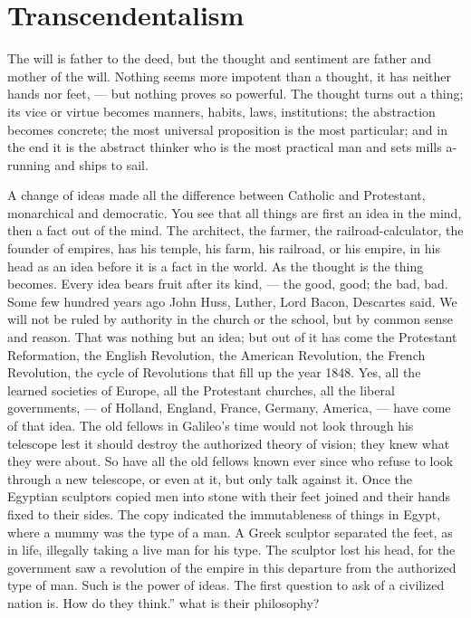 \documentclass[12pt]{article}
\begin{document}
\section*{Transcendentalism}

The will is father to the deed, but the thought and 
sentiment are father and mother of the will. Nothing 
seems more impotent than a thought, it has neither 
hands nor feet, --- but nothing proves so powerful. The 
thought turns out a thing; its vice or virtue becomes 
manners, habits, laws, institutions; the abstraction becomes concrete; the most universal proposition is the 
most particular; and in the end it is the abstract 
thinker who is the most practical man and sets mills 
a-running and ships to sail. 

A change of ideas made all the difference between 
Catholic and Protestant, monarchical and democratic. 
You see that all things are first an idea in the mind, 
then a fact out of the mind. The architect, the 
farmer, the railroad-calculator, the founder of empires, 
has his temple, his farm, his railroad, or his empire, 
in his head as an idea before it is a fact in the world. 
As the thought is the thing becomes. Every idea bears 
fruit after its kind, --- the good, good; the bad, bad. 
Some few hundred years ago John Huss, Luther, Lord 
Bacon, Descartes said. We will not be ruled by authority in the church or the school, but by common sense 
and reason. That was nothing but an idea; but out of 
it has come the Protestant Reformation, the English 
Revolution, the American Revolution, the French Revolution, the cycle of Revolutions that fill up the year 
1848. Yes, all the learned societies of Europe, all the 
Protestant churches, all the liberal governments, --- of 
%
Holland, England, France, Germany, America, --- have 
come of that idea. The old fellows in Galileo's time 
would not look through his telescope lest it should destroy the authorized theory of vision; they knew what 
they were about. So have all the old fellows known 
ever since who refuse to look through a new telescope, 
or even at it, but only talk against it. Once the Egyptian sculptors copied men into stone with their feet 
joined and their hands fixed to their sides. The copy 
indicated the immutableness of things in Egypt, where 
a mummy was the type of a man. A Greek sculptor 
separated the feet, as in life, illegally taking a live 
man for his type. The sculptor lost his head, for the 
government saw a revolution of the empire in this departure from the authorized type of man. Such is the 
power of ideas. The first question to ask of a civilized 
nation is. How do they think.'' what is their philosophy? 
\end{document}
